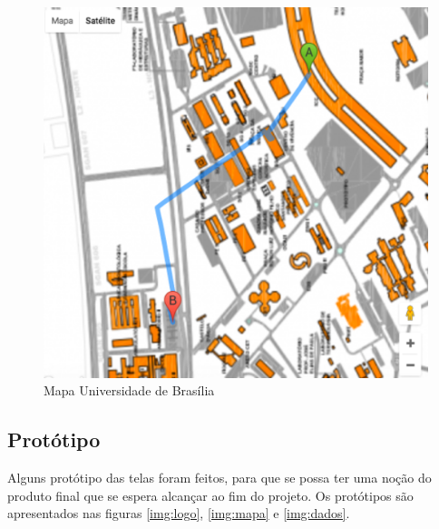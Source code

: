 \graphicspath{{figuras/}}
\begin{figure}[!htb]
\centering
\includegraphics[scale=0.80]{mapa_unb_2}
\caption{Mapa Universidade de Brasília}
\label{img:mapa_unb2}
\end{figure}

\newpage

	\subsection{Protótipo}
	Alguns protótipo das telas foram feitos, para que se possa ter uma noção do produto final que se espera alcançar ao fim do projeto. Os protótipos são apresentados nas figuras \ref{img:logo}, \ref{img:mapa} e \ref{img:dados}.
	
